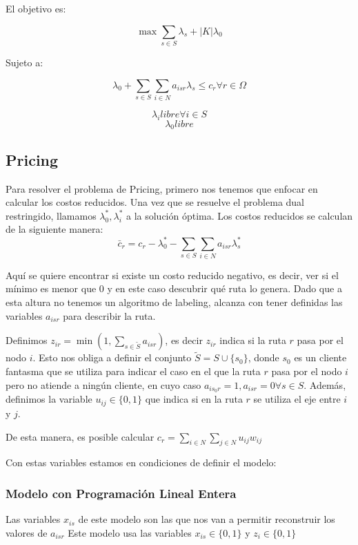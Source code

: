 El objetivo es:

\[\max \sum_{s \in S} \lambda_s + |K| \lambda_0 \]

Sujeto a:

\[
\lambda_0 + \sum_{s \in S}\sum_{i \in N}{a_{isr}\lambda_s} \leq c_r
\forall {r \in \Omega}
\]

\[
\lambda_i \textit{libre} 
\forall {i \in S}
\]
\[
\lambda_0 \textit{libre}
\]
\subsection{Pricing}

Para resolver el problema de Pricing, primero nos tenemos que enfocar en calcular los costos reducidos. Una vez que se resuelve el problema dual restringido, llamamos $\lambda^*_0, \lambda^*_i$ a la solución óptima. Los costos reducidos se calculan de la siguiente manera:
\[
\bar{c}_r = c_r - \lambda^*_0 - \sum_{s \in S}\sum_{i \in N}{a_{isr}\lambda^*_s} 
\]

Aquí se quiere encontrar si existe un costo reducido negativo, es decir, ver si el mínimo es menor que $0$ y en este caso descubrir qué ruta lo genera. Dado que a esta altura no tenemos un algoritmo de labeling, alcanza con tener definidas las variables $a_{isr}$ para describir la ruta.

Definimos $z_{ir} = \min(1, \sum_{s \in \tilde{S}}{a_{isr}})$, es decir $z_{ir}$ indica si la ruta $r$ pasa por el nodo $i$. Esto nos obliga a definir el conjunto $\tilde{S} = S \cup \{s_0\}$, donde $s_0$ es un cliente fantasma que se utiliza para indicar el caso en el que la ruta $r$ pasa por el nodo $i$ pero no atiende a ningún cliente, en cuyo caso $a_{i s_0 r} = 1, a_{isr} = 0 \forall s \in S$.
Además, definimos la variable $u_{ij} \in \{0, 1\}$ que indica si en la ruta $r$ se utiliza el eje entre $i$ y $j$.

De esta manera, es posible calcular $c_r = \sum_{i \in N} \sum_{j \in N} {u_{ij} w_{ij}}$

Con estas variables estamos en condiciones de definir el modelo:

\subsubsection{Modelo con Programación Lineal Entera}

Las variables $x_{is}$ de este modelo son las que nos van a permitir reconstruir los valores de $a_{isr}$
Este modelo usa las variables $x_{is} \in \{0, 1\}$ y $z_i \in \{0, 1\}$ 

